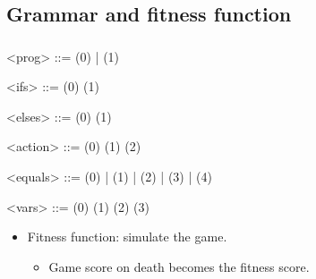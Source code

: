 \documentclass{beamer}
\makeatletter
\newcommand*{\currentname}{\@currentlabelname}
\makeatother
\begin{document}
\subsection{Grammar and fitness function}
\begin{frame}
\frametitle{\currentname}

\begin{grammar}
<prog>      ::=   (0) |   (1) 				   \hspace{1em}

<ifs>     ::=    
				  \lit*{ )\{ }  \lit*{ \}}	\hfill (0) \hspace{1em}
		          
				  \lit*{ )\{ }  \lit*{ \}}	\hfill (1) \hspace{1em}
				 
<elses>   ::=       \lit*{ \}}  			\hfill (0) \hspace{1em}
			      \lit*{ \}}  			\hfill (1) \hspace{1em}


<action> ::=   						  		\hfill (0) \hspace{1em}
		 \alt {} 						\hfill (1) \hspace{1em}
		 \alt {} 						\hfill (2) \hspace{1em}
		 
<equals> ::=  \lit*{<} (0)  | \lit*{<=} (1) | \lit*{>} (2) 
		 | \lit*{>=} (3) | \lit*{==} (4)									   \hspace{1em}

<vars> ::=   						  	\hfill (0) \hspace{1em}
	   \alt {} 							\hfill (1) \hspace{1em}
	   \alt {} 							\hfill (2) \hspace{1em}
 	   \alt {} 										\hfill (3) \hspace{1em}


\end{grammar}

\begin{itemize}
	\item Fitness function: simulate the game.
	\begin{itemize}
		\item Game score on death becomes the fitness score.
	\end{itemize}
\end{itemize}


\end{frame}
\end{document}
